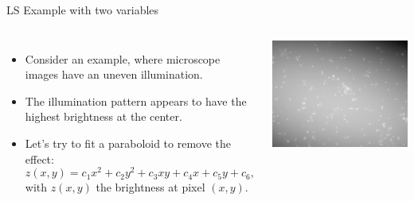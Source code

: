 \documentclass[10pt, aspectratio=169]{beamer} %
\begin{document}
\begin{frame}
[allowframebreaks=0.8]
{LS Example with two variables}
\begin{columns}[onlytextwidth]
\begin{itemize}
\item Consider an example, where microscope images have an uneven illumination.
\item The illumination pattern appears to have the highest brightness at the center.
\item Let's try to fit a paraboloid to remove the effect:
\[
z(x,y) = c_1 x^2 + c_2 y^2 + c_3xy + c_4x + c_5y + c_6,
\]
with $z(x,y)$ the brightness at pixel $(x,y)$.
\end{itemize}

\includegraphics[width=\textwidth]{unevenIllumination}
\end{columns}

\end{frame}
\end{document}
